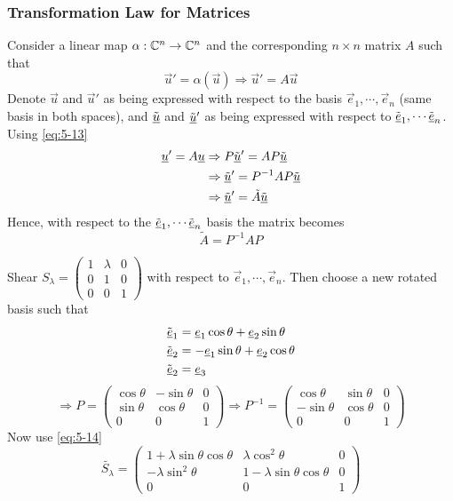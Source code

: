 \documentclass{article}
\numberwithin{equation}{section}
\begin{document}
\subsubsection{Transformation Law for Matrices}
Consider a linear map $\alpha: \mathbb{C}^n \rightarrow \mathbb{C}^n$ and the corresponding $n \times n$ matrix $A$ such that
\[
    \vec u' = \alpha(\vec u) \Rightarrow \vec u' = A \vec u
\]
Denote $\vec u$ and $\vec u'$ as being expressed with respect to the basis $\vec e_1, \cdots, \vec e_n$ (same basis in both spaces),
and $\tilde{\underline{u}}$ and $\tilde{\underline{u}}'$ as being expressed with respect to $\tilde{\underline{e}}_1, \cdots \tilde{\underline{e}}_n$.
Using \eqref{eq:5-13}
\begin{align*}
    \underline{u}' = A \underline{u} &\Rightarrow P \tilde{\underline{u}}' = A P \tilde{\underline{u}} \\
    &\Rightarrow \tilde{\underline{u}}' = P^{-1} A P \tilde{\underline{u}} \\
    &\Rightarrow \tilde{\underline{u}}' = \tilde{A} \tilde{\underline{u}}
\end{align*}
Hence, with respect to the $\tilde{\underline{e}}_1, \cdots \tilde{\underline{e}}_n$ basis the matrix becomes
\begin{equation}\label{eq:5-14}
    \tilde{A} = P^{-1} A P
\end{equation}


\begin{eg}
    Shear $S_\lambda = \begin{pmatrix}
        1 & \lambda & 0 \\
        0 & 1 & 0 \\
        0 & 0 & 1
    \end{pmatrix}$ with respect to $\vec e_1, \cdots, \vec e_n$. 
    Then choose a new rotated basis such that
    \begin{align*}
        \tilde{\underline{e}}_1 &= \underline{e}_1 \cos \theta + \underline{e}_2 \sin \theta \\
        \tilde{\underline{e}}_2 &= - \underline{e}_1 \sin \theta + \underline{e}_2 \cos \theta \\
        \tilde{\underline{e}}_2 &= \underline{e}_3
    \end{align*}
    \[
        \Rightarrow P = \begin{pmatrix}
            \cos \theta & -\sin \theta & 0 \\
            \sin \theta & \cos \theta & 0 \\
            0 & 0 & 1
        \end{pmatrix}
        \Rightarrow P^{-1} = \begin{pmatrix}
            \cos \theta & \sin \theta & 0 \\
            -\sin \theta & \cos \theta & 0 \\
            0 & 0 & 1
        \end{pmatrix}
    \]
    Now use \eqref{eq:5-14}
    \[
        \tilde{S_\lambda} = \begin{pmatrix}
            1 + \lambda \sin \theta \cos \theta & \lambda \cos^2 \theta & 0 \\
            -\lambda \sin^2 \theta & 1 - \lambda \sin \theta \cos \theta & 0 \\
            0 & 0 & 1
        \end{pmatrix}
    \]
\end{eg}
\end{document}
